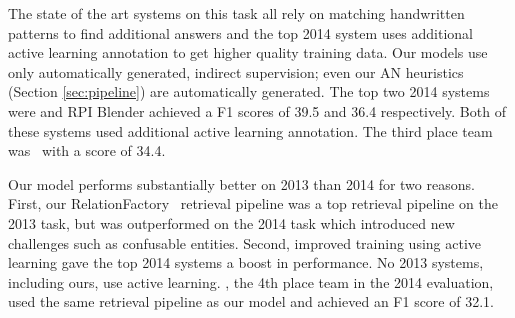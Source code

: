 The state of the art systems on this task all rely on matching handwritten patterns to find additional answers and the top 2014 system uses additional active learning annotation to get higher quality training data. Our models use only automatically generated, indirect supervision; even our AN heuristics (Section \ref{sec:pipeline}) are automatically generated. The top two 2014 systems were \citet{angeli2014stanford} and RPI Blender \citep{SurdeanuMihai2014} achieved a F1 scores of 39.5 and 36.4 respectively. Both of these systems used additional active learning annotation. The third place team was~\citet{Lin2014} with a score of 34.4. 

Our model performs substantially better on 2013 than 2014 for two reasons. First, our RelationFactory~\citep{roth2014relationfactory} retrieval pipeline was a top retrieval pipeline on the 2013 task, but was outperformed on the 2014 task which introduced new challenges such as confusable entities. Second, improved training using active learning gave the top 2014 systems a boost in performance. No 2013 systems, including ours, use active learning. \citet{bentortac14}, the 4th place team in the 2014 evaluation, used the same retrieval pipeline \citep{roth2014relationfactory} as our model and achieved an F1 score of 32.1.



